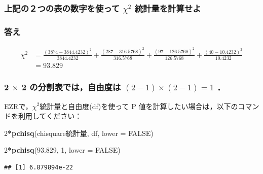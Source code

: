 \documentclass[11pt,]{problemset}
\newenvironment{Shaded}{\begin{snugshade}}{\end{snugshade}}
\newcommand{\DataTypeTok}[1]{\textcolor[rgb]{0.13,0.29,0.53}{#1}}
\newcommand{\DecValTok}[1]{\textcolor[rgb]{0.00,0.00,0.81}{#1}}
\newcommand{\FloatTok}[1]{\textcolor[rgb]{0.00,0.00,0.81}{#1}}
\newcommand{\KeywordTok}[1]{\textcolor[rgb]{0.13,0.29,0.53}{\textbf{#1}}}
\newcommand{\NormalTok}[1]{#1}
\newcommand{\OperatorTok}[1]{\textcolor[rgb]{0.81,0.36,0.00}{\textbf{#1}}}
\newcommand{\OtherTok}[1]{\textcolor[rgb]{0.56,0.35,0.01}{#1}}
\begin{document}
\hypertarget{-chi2-}{%
\subsubsection{\texorpdfstring{上記の２つの表の数字を使って \(\chi^2\)
統計量を計算せよ}{上記の２つの表の数字を使って \textbackslash{}chi\^{}2 統計量を計算せよ}}\label{-chi2-}}

\hypertarget{-6}{%
\subsubsection{答え}\label{-6}}

\[
\begin{aligned}
\chi^2 & = \frac{(3874 - 3844.4232)^2}{3844.4232} + \frac{(287 - 316.5768)^2}{316.5768} + \frac{(97 - 126.5768)^2}{126.5768} + \frac{(40 - 10.4232)^2}{10.4232} \\
       & = 93.829
\end{aligned}
\]

\hypertarget{times-2--2-1times2-1-1}{%
\subsubsection{\texorpdfstring{2 \(\times\) 2 の分割表では，自由度は
\((2-1)\times(2-1) = 1\)
．}{2 \textbackslash{}times 2 の分割表では，自由度は (2-1)\textbackslash{}times(2-1) = 1 ．}}\label{times-2--2-1times2-1-1}}

EZRで，\(\chi^2\)統計量と自由度(df)を使って P
値を計算したい場合は，以下のコマンドを利用してください：

\begin{Shaded}
\begin{Highlighting}[]
\DecValTok{2}\OperatorTok{*}\KeywordTok{pchisq}\NormalTok{(chisquare統計量, df, }\DataTypeTok{lower =} \OtherTok{FALSE}\NormalTok{)}
\end{Highlighting}
\end{Shaded}

\begin{Shaded}
\begin{Highlighting}[]
\DecValTok{2}\OperatorTok{*}\KeywordTok{pchisq}\NormalTok{(}\FloatTok{93.829}\NormalTok{, }\DecValTok{1}\NormalTok{, }\DataTypeTok{lower =} \OtherTok{FALSE}\NormalTok{)}
\end{Highlighting}
\end{Shaded}

\begin{verbatim}
## [1] 6.879894e-22
\end{verbatim}
\end{document}
